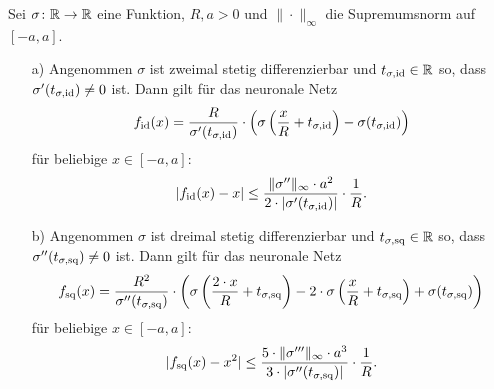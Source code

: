 \begin{lem}
  \label{lem:1}
  Sei $\sigma \colon \mathbb{R} \to \mathbb{R}$ eine Funktion, $R, a > 0$ und $\|\cdot\|_{\infty}$ die Supremumsnorm auf $[-a, a]$.
  \begin{itemize}
  \item[a)] Angenommen $\sigma$ ist zweimal stetig differenzierbar und $t_{\sigma,\mathrm{id}} \in \mathbb{R}$ so, dass $\sigma'(t_{\sigma, \mathrm{id}}) \neq 0$ ist. Dann gilt für das neuronale Netz
  $$ f_{\mathrm{id}}(x) = \frac{R}{\sigma'(t_{\sigma, \mathrm{id}})} \cdot \left(\sigma\left(\frac{x}{R} + t_{\sigma, \mathrm{id}}\right) - \sigma(t_{\sigma, \mathrm{id}})\right)$$
  für beliebige $x \in [-a, a]\colon$ 
  $$ |f_{\mathrm{id}}(x) - x| \leq \frac{\|\sigma''\|_{\infty} \cdot a^2}{2 \cdot |\sigma'(t_{\sigma, \mathrm{id}})|} \cdot \frac{1}{R}.$$
  \item[b)] Angenommen $\sigma$ ist dreimal stetig differenzierbar und $t_{\sigma,\mathrm{sq}} \in \mathbb{R}$ so, dass $\sigma''(t_{\sigma, \mathrm{sq}}) \neq 0$ ist. Dann gilt für das neuronale Netz
  $$ f_{\mathrm{sq}}(x) = \frac{R^2}{\sigma''(t_{\sigma, \mathrm{sq}})} \cdot \left(\sigma\left(\frac{2 \cdot x}{R} + t_{\sigma, \mathrm{sq}}\right) - 2 \cdot \sigma\left(\frac{x}{R} + t_{\sigma, \mathrm{sq}}\right)+ \sigma(t_{\sigma, \mathrm{sq}})\right)$$
  für beliebige $x \in [-a, a]\colon$ 
  $$ |f_{\mathrm{sq}}(x) - x^2| \leq \frac{5 \cdot \|\sigma'''\|_{\infty} \cdot a^3}{3 \cdot |\sigma''(t_{\sigma, \mathrm{sq}})|} \cdot \frac{1}{R}.$$
  \end{itemize}
\end{lem}
